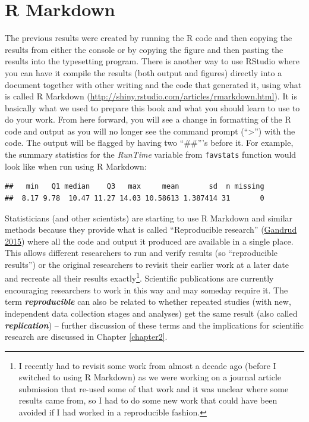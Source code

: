 \documentclass[
]{book}
\newenvironment{Shaded}{\begin{snugshade}}{\end{snugshade}}
\newcommand{\FunctionTok}[1]{\textcolor[rgb]{0.00,0.00,0.00}{#1}}
\newcommand{\NormalTok}[1]{#1}
\newcommand{\SpecialCharTok}[1]{\textcolor[rgb]{0.00,0.00,0.00}{#1}}
\begin{document}
\hypertarget{section1-4}{%
\section{R Markdown}\label{section1-4}}

The previous results were created by running the R code and then copying the
results from either the console or by copying the figure and then pasting the results
into the typesetting program. There is another way
to use RStudio where you can have it compile the results (both output and
figures) directly into a document together with other writing and the code that generated it,
using what is called R Markdown (\url{http://shiny.rstudio.com/articles/rmarkdown.html}).
It is basically what we used to prepare this book and what you should learn to use to do your work.
From here forward, you will see a
change in formatting of the R code and output as you will no
longer see the command prompt (``\textgreater{}'') with the code. The output will be
flagged by having two ``\#\#'''s before it. For example, the summary statistics for
the \emph{RunTime} variable from \texttt{favstats} function would look like when run using R Markdown:

\begin{Shaded}
\end{Shaded}

\begin{verbatim}
##   min   Q1 median    Q3   max     mean       sd  n missing
##  8.17 9.78  10.47 11.27 14.03 10.58613 1.387414 31       0
\end{verbatim}

\indent Statisticians (and other scientists) are starting to use R Markdown and
similar methods because they provide what is called ``Reproducible
research'' (\protect\hyperlink{ref-Gandrud2015}{Gandrud 2015}) where all the code and output it produced are
available in a single place. This allows different researchers to run and verify
results (so ``reproducible results'') or the original researchers to revisit their
earlier work at a later date and recreate all their results exactly\footnote{I recently
  had to revisit some work from almost a decade ago (before I switched to using R
  Markdown) as we were working on a journal article submission that re-used some
  of that work and it was unclear where some results came from, so I had to do
  some new work that could have been avoided if I had worked in a reproducible
  fashion.}. Scientific publications are currently
encouraging researchers to work in this way and may someday require it. The
term \textbf{\emph{reproducible}}  can also be related to whether
repeated studies (with new, independent data collection stages and analyses)
get the same result (also called \textbf{\emph{replication}})  --
further discussion of these terms and the implications for scientific research
are discussed in Chapter \ref{chapter2}.
\end{document}
